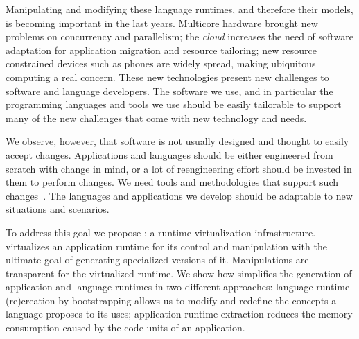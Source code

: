 Manipulating and modifying these language runtimes, and therefore their models, is becoming important in the last years. Multicore hardware brought new problems on concurrency and parallelism; the \emph{cloud} increases the need of software adaptation for application migration and resource tailoring; new resource constrained devices such as phones are widely spread, making ubiquitous computing a real concern. These new technologies present new challenges to software and language developers. The software we use, and in particular the programming languages and tools we use should be easily tailorable to support many of the new challenges that come with new technology and needs.

We observe, however, that software is not usually designed and thought to easily accept changes. Applications and languages should be either engineered from scratch with change in mind, or a lot of reengineering effort should be invested in them to perform changes. We need tools and methodologies that support such changes~\cite{Nier08b}. The languages and applications we develop should be adaptable to new situations and scenarios.

To address this goal we propose \emph{\Vtt}: a runtime virtualization infrastructure. \Vtt virtualizes an application runtime for its control and manipulation with the ultimate goal of generating specialized versions of it. Manipulations are transparent for the virtualized runtime. We show how \Vtt simplifies the generation of application and language runtimes in two different approaches: language runtime (re)creation by bootstrapping allows us to modify and redefine the concepts a language proposes to its uses; application runtime extraction reduces the memory consumption caused by the code units of an application.




